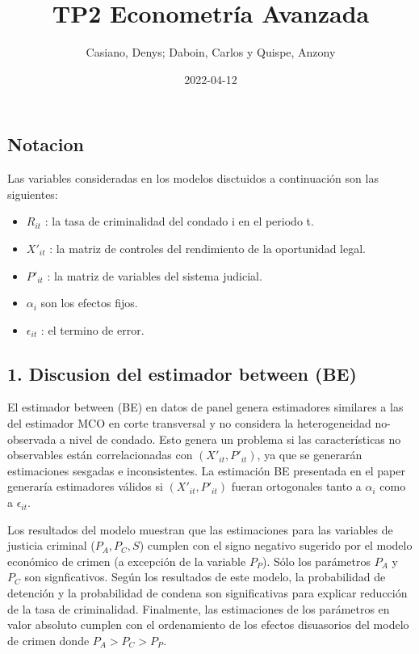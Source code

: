 \documentclass[
]{article}
\title{TP2 Econometría Avanzada}
\author{Casiano, Denys; Daboin, Carlos y Quispe, Anzony}
\date{2022-04-12}
\providecommand{\tightlist}{%
  \setlength{\itemsep}{0pt}\setlength{\parskip}{0pt}}
\begin{document}
\maketitle

\hypertarget{notacion}{%
\subsection{Notacion}\label{notacion}}

Las variables consideradas en los modelos disctuidos a continuación son
las siguientes:

\begin{itemize}
\tightlist
\item
  \(R_{it}\) : la tasa de criminalidad del condado i en el periodo t.
\item
  \(X'_{it}\) : la matriz de controles del rendimiento de la oportunidad
  legal.
\item
  \(P'_{it}\) : la matriz de variables del sistema judicial.
\item
  \(\alpha_{i}\) son los efectos fijos.
\item
  \(\epsilon_{it}\) : el termino de error.
\end{itemize}

\hypertarget{discusion-del-estimador-between-be}{%
\subsection{1. Discusion del estimador between
(BE)}\label{discusion-del-estimador-between-be}}

El estimador between (BE) en datos de panel genera estimadores similares
a las del estimador MCO en corte transversal y no considera la
heterogeneidad no-observada a nivel de condado. Esto genera un problema
si las características no observables están correlacionadas con
\((X'_{it},P'_{it})\), ya que se generarán estimaciones sesgadas e
inconsistentes. La estimación BE presentada en el paper generaría
estimadores válidos si \((X'_{it},P'_{it})\) fueran ortogonales tanto a
\(\alpha_i\) como a \(\epsilon_{it}\).

Los resultados del modelo muestran que las estimaciones para las
variables de justicia criminal (\(P_A, P_C, S\)) cumplen con el signo
negativo sugerido por el modelo económico de crimen (a excepción de la
variable \(P_P\)). Sólo los parámetros \(P_A\) y \(P_C\) son
signficativos. Según los resultados de este modelo, la probabilidad de
detención y la probabilidad de condena son significativas para explicar
reducción de la tasa de criminalidad. Finalmente, las estimaciones de
los parámetros en valor absoluto cumplen con el ordenamiento de los
efectos disuasorios del modelo de crimen donde \(P_A>P_C>P_P\).
\end{document}
